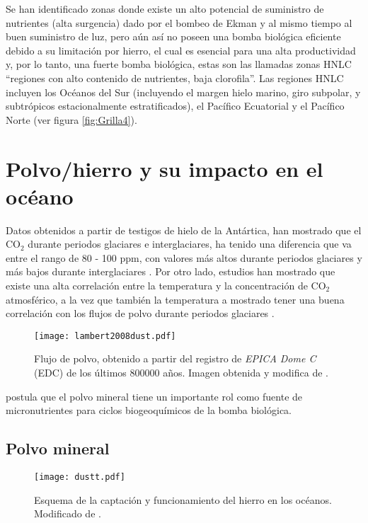Se han identificado zonas donde existe un alto potencial de suministro de nutrientes (alta surgencia) dado por el bombeo de Ekman y al mismo tiempo al buen suministro de luz, pero aún as\'i no poseen una bomba biol\'ogica eficiente debido a su limitación por hierro, el cual es esencial para una alta productividad y, por lo tanto, una fuerte bomba biol\'ogica,  estas son las llamadas zonas HNLC ``regiones con alto contenido de nutrientes, baja clorofila''. Las regiones HNLC incluyen los Océanos del Sur (incluyendo el margen hielo marino, giro subpolar, y subtr\'opicos estacionalmente estratificados), el Pacífico Ecuatorial y el Pacífico Norte (ver figura \ref{fig:Grilla4}). 

\section{Polvo/hierro y su impacto en el oc\'eano}

Datos obtenidos a partir de testigos de hielo de la Antártica, han mostrado que el CO$_2$ durante periodos glaciares e interglaciares, ha tenido una diferencia que va entre el rango de 80 - 100 ppm, con valores más altos durante periodos glaciares y más bajos durante interglaciares \citep{anderson2002southern,luthi2008high}. Por otro lado, estudios han mostrado que existe una alta correlación entre la temperatura y la concentración de CO$_2$ atmosférico, a la vez que también la temperatura a mostrado tener una buena correlación con los flujos de polvo durante periodos glaciares \citep{lambert2008dust}. \newpage

\begin{figure}[H]
\centering
 \texttt{[image: lambert2008dust.pdf]}
 \caption[Polvo en los últimos 800000 años]{Flujo de polvo, obtenido a partir del registro de \textit{EPICA Dome C} (EDC) de los últimos 800000 años. Imagen obtenida y modifica de \cite{lambert2008dust}.}
  \label{fig:dust}
\end{figure}

\cite{martin1990glacial} postula que el polvo mineral tiene un importante rol como fuente de micronutrientes para ciclos biogeoquímicos de la bomba biológica. 

\subsection{Polvo mineral}

\begin{figure}[H]
\centering
 \texttt{[image: dustt.pdf]}
 \caption[Ciclo del hierro oceánico]{Esquema de la captación y funcionamiento del hierro en los océanos. Modificado de \citep{tagliabue2017integral}.}
  \label{fig:dust0}
\end{figure}

